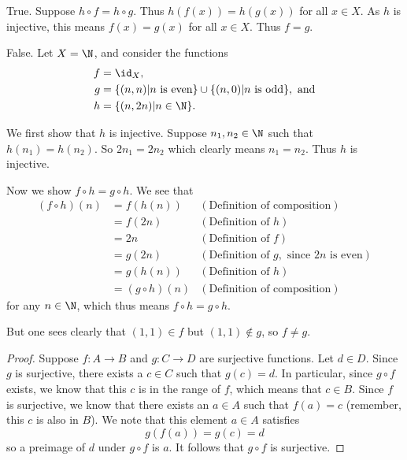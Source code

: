 \begin{questions}
    \item \begin{partquestions}{\alph*}
        \item True. Suppose $h \circ f = h \circ g$. Thus $h(f(x)) = h(g(x))$ for all $x \in X$. As $h$ is injective, this means $f(x) = g(x)$ for all $x \in X$. Thus $f = g$.
        \item False. Let $X = \N$, and consider the functions
        \begin{align*}
            f &= \id_X,\\
            g &= \{(n, n) \vert n \text{ is even}\} \cup \{(n, 0) \vert n \text{ is odd}\}, \text{ and}\\
            h &= \{(n, 2n) \vert n \in \N\}.
        \end{align*}
        
        We first show that $h$ is injective. Suppose $n_1, n_2 \in \N$ such that $h(n_1) = h(n_2)$. So $2n_1 = 2n_2$ which clearly means $n_1 = n_2$. Thus $h$ is injective.

        Now we show $f \circ h = g \circ h$. We see that
        \begin{align*}
            (f \circ h)(n) &= f(h(n)) & (\text{Definition of composition})\\
            &= f(2n) & (\text{Definition of } h)\\
            &= 2n & (\text{Definition of } f)\\
            &= g(2n) & (\text{Definition of } g, \text{ since } 2n \text{ is even})\\
            &= g(h(n)) & (\text{Definition of } h)\\
            &= (g \circ h)(n) & (\text{Definition of composition})
        \end{align*}
        for any $n \in \N$, which thus means $f \circ h = g \circ h$.

        But one sees clearly that $(1, 1) \in f$ but $(1, 1) \notin g$, so $f \neq g$.
    \end{partquestions}

    \item \begin{proof}
        Suppose $f: A \to B$ and $g: C \to D$ are surjective functions. Let $d \in D$. Since $g$ is surjective, there exists a $c \in C$ such that $g(c) = d$. In particular, since $g \circ f$ exists, we know that this $c$ is in the range of $f$, which means that $c \in B$. Since $f$ is surjective, we know that there exists an $a \in A$ such that $f(a) = c$ (remember, this $c$ is also in $B$). We note that this element $a \in A$ satisfies
        \[
            g(f(a)) = g(c) = d
        \]
        so a preimage of $d$ under $g \circ f$ is $a$. It follows that $g \circ f$ is surjective.
    \end{proof}


\end{questions}
